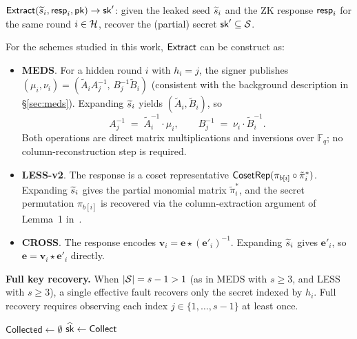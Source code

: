 \begin{definition}[Extract]
\label{def:extract}
$\mathsf{Extract}(\widetilde{s}_i, \mathsf{resp}_i, \mathsf{pk}) \to \mathsf{sk}'$: given the leaked seed
$\widetilde{s}_i$ and the ZK response $\mathsf{resp}_i$ for the same round $i \in \mathcal{H}$,
recover the (partial) secret $\mathsf{sk}' \subseteq \mathcal{S}$.
\end{definition}

For the schemes studied in this work, $\mathsf{Extract}$ can be construct 
as:
\begin{itemize}
  \item \textbf{MEDS}.
        For a hidden round $i$ with $h_i = j$, the signer publishes
        $(\mu_i, \nu_i) = (\widetilde{A}_iA_j^{-1},\, B_j^{-1}\widetilde{B}_i)$
        (consistent with the background description in \S\ref{sec:meds}).
        Expanding $\widetilde{s}_i$ yields $(\widetilde{A}_i, \widetilde{B}_i)$,
        so
        \[
          A_j^{-1} \;=\; \widetilde{A}_i^{-1} \cdot \mu_i ,
          \qquad
          B_j^{-1} \;=\; \nu_i \cdot \widetilde{B}_i^{-1}.
        \]
        Both operations are direct matrix multiplications and inversions
        over $\mathbb{F}_q$; no column-reconstruction step is required.
  \item \textbf{LESS-v2}.
        The response is a coset representative
        $\mathsf{CosetRep}(\pi_{b[i]} \circ \tilde{\pi}_i^*)$.
        Expanding $\widetilde{s}_i$ gives the partial monomial matrix
        $\tilde{\pi}_i^*$, and the secret permutation $\pi_{b[i]}$ is
        recovered via the column-extraction argument of
        Lemma~1 in~\cite{FaultToForge2025}.
  \item \textbf{CROSS}.
        The response encodes $\mathbf{v}_i = \mathbf{e} \star
        (\mathbf{e}'_i)^{-1}$.
        Expanding $\widetilde{s}_i$ gives $\mathbf{e}'_i$, so
        $\mathbf{e} = \mathbf{v}_i \star \mathbf{e}'_i$ directly.
\end{itemize}

\noindent\textbf{Full key recovery.}
When $|\mathcal{S}| = s - 1 > 1$ (as in MEDS with $s \geq 3$, and
LESS with $s \geq 3$), a single effective fault recovers only the secret
indexed by $h_i$.  Full recovery requires observing each index
$j \in \{1,\ldots,s-1\}$ at least once.

\begin{algorithm}[tb]
\caption{GZKST key recovery from faulted oracle}
\label{alg:key-recovery}
$\mathsf{Collected} \leftarrow \emptyset$\;
\Return $\widehat{\mathsf{sk}} \leftarrow \mathsf{Collect}$\;
\end{algorithm}

